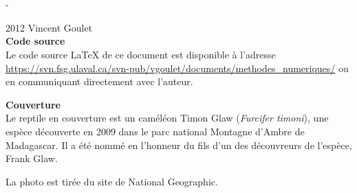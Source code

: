 

\cleardoublepage

\begin{adjustwidth*}{13.1mm}{-72mm}
  \sffamily
  \raggedright
  \vspace*{5mm}
  \thetitle \\
  \vspace*{3cm}
  \theauthor \\
  \vspace*{\fill}
  \thedate
\end{adjustwidth*}
\clearpage

\begingroup
\calccentering{\unitlength}
\begin{adjustwidth*}{\unitlength}{-\unitlength}
  \small
  \setlength{\parindent}{0pt}
  \setlength{\parskip}{\baselineskip}

  {\textcopyright} 2012 Vincent Goulet \\

  

  \textbf{Code source} \\
  Le code source {\LaTeX} de ce document est disponible à l'adresse
    \url{https://svn.fsg.ulaval.ca/svn-pub/vgoulet/documents/methodes_numeriques/}
  ou en communiquant directement avec l'auteur.

  \textbf{Couverture} \\
  Le reptile en couverture est un caméléon Timon Glaw (\emph{Furcifer
    timoni}), une espèce découverte en 2009 dans le parc national
  Montagne d’Ambre de Madagascar. Il a été nommé en l'honneur du fils
  d'un des découvreurs de l'espèce, Frank Glaw.

  La photo est tirée du site de National Geographic.
\end{adjustwidth*}
\endgroup

\clearpage

